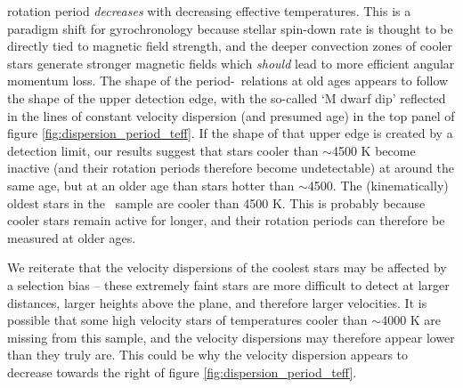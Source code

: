 rotation period {\it decreases} with decreasing effective temperatures.
This is a paradigm shift for gyrochronology because stellar spin-down rate is
thought to be directly tied to magnetic field strength, and the deeper
convection zones of cooler stars generate stronger magnetic fields which {\it
should} lead to more efficient angular momentum loss.
The shape of the period-\teff\ relations at old ages appears to follow the
shape of the upper detection edge, with the so-called `M dwarf dip'
\citep{vansaders2018} reflected in the lines of constant velocity dispersion
(and presumed age) in the top panel of figure
\ref{fig:dispersion_period_teff}.
If the shape of that upper edge is created by a detection limit, our results
suggest that stars cooler than $\sim$4500 K become inactive (and their
rotation periods therefore become undetectable) at around the same age, but at
an older age than stars hotter than $\sim$4500.
The (kinematically) oldest stars in the \mct\ sample are cooler than 4500 K.
This is probably because cooler stars remain active for longer, and their
rotation periods can therefore be measured at older ages.

We reiterate that the velocity dispersions of the coolest stars may be
affected by a selection bias -- these extremely faint stars are more difficult
to detect at larger distances, larger heights above the plane, and therefore
larger velocities.
It is possible that some high velocity stars of temperatures cooler than
$\sim$4000 K are missing from this sample, and the velocity dispersions may
therefore appear lower than they truly are.
This could be why the velocity dispersion appears to decrease towards the
right of figure \ref{fig:dispersion_period_teff}.
